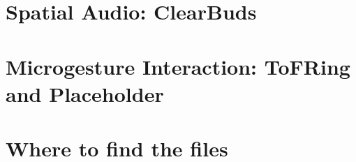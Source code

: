 \documentclass [11pt, proquest] {uwthesis}[2020/02/24]
\begin{document}
\chapter{Spatial Audio: ClearBuds}


\chapter{Microgesture Interaction: ToFRing and Placeholder}





%
%
\nocite{*}   %


%
%
\appendix
\raggedbottom\sloppy
 
 
\chapter{Where to find the files}
 
\end{document}
